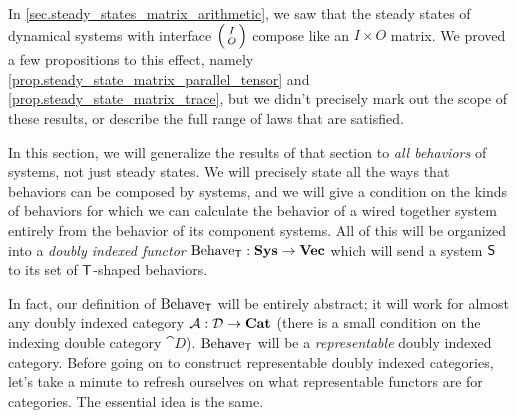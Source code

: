 \documentclass[DynamicalBook]{subfiles}
\begin{document}
In \cref{sec.steady_states_matrix_arithmetic}, we saw that the steady states of
dynamical systems with interface $\lens{I}{O}$ compose like an $I \times O$
matrix. We proved a few propositions to this effect, namely
\cref{prop.steady_state_matrix_parallel_tensor} and
\cref{prop.steady_state_matrix_trace}, but we didn't precisely mark out the
scope of these results, or describe the full range of laws that are satisfied.

In this section, we will generalize the results of that section to \emph{all
  behaviors} of systems, not just steady states. We will precisely state all the
ways that behaviors can be composed by systems, and we will give a condition on
the kinds of behaviors for which we can calculate the behavior of a wired
together system entirely from the behavior of its component systems. All of this will be organized into a \emph{doubly indexed functor}
$\mathrm{Behave}_{\mathsf{T}} : \textbf{Sys} \to \textbf{Vec}$
which will send a system $\mathsf{S}$ to its set of
$\mathsf{T}$-shaped behaviors. 

In fact, our definition of $\mathrm{Behave}_{\mathsf{T}}$ will be entirely abstract;
it will work for almost any doubly indexed category $\mathcal{A} : \mathcal{D} \to \textbf{Cat}$ (there is a small condition
on the indexing double category $\cat{D}$). $\mathrm{Behave}_{\mathsf{T}}$ will be a
\emph{representable} doubly indexed category. Before going on to construct
representable doubly indexed categories, let's take a minute to refresh
ourselves on what representable functors are for categories. The essential idea
is the same.
\end{document}

